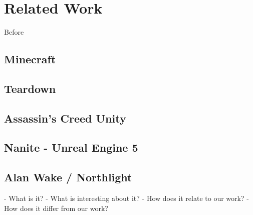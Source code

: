 \chapter{Related Work} \label{cpt-related-work}

Before 

\section{Minecraft}

\section{Teardown}

\section{Assassin's Creed Unity}

\section{Nanite - Unreal Engine 5}

\section{Alan Wake / Northlight}





- What is it?
- What is interesting about it?
- How does it relate to our work?
- How does it differ from our work?
